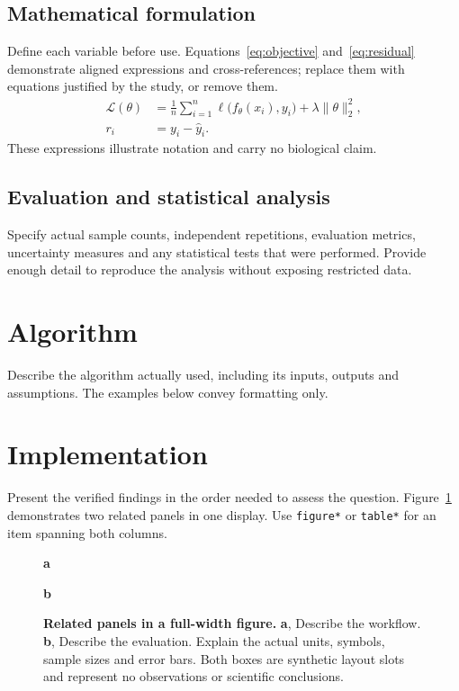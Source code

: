 \documentclass[unnumsec,webpdf,contemporary,large,namedate]{oup-authoring-template}
\begin{document}
\subsection{Mathematical formulation}
Define each variable before use. Equations~\eqref{eq:objective}
and~\eqref{eq:residual} demonstrate aligned expressions and cross-references;
replace them with equations justified by the study, or remove them.
\begin{align}
 \mathcal{L}(\theta)&=\frac{1}{n}\sum_{i=1}^{n}
  \ell\bigl(f_\theta(x_i),y_i\bigr)
  +\lambda\lVert\theta\rVert_2^2,\label{eq:objective}\\
 r_i&=y_i-\widehat y_i.\label{eq:residual}
\end{align}
These expressions illustrate notation and carry no biological claim.

\subsection{Evaluation and statistical analysis}
Specify actual sample counts, independent repetitions, evaluation metrics,
uncertainty measures and any statistical tests that were performed. Provide
enough detail to reproduce the analysis without exposing restricted data.

\section{Algorithm}\label{sec:algorithm}
Describe the algorithm actually used, including its inputs, outputs and
assumptions. The examples below convey formatting only.

\section{Implementation}\label{sec:implementation}
Present the verified findings in the order needed to assess the question.
Figure~\ref{fig:comparison} demonstrates two related panels in one display.
Use \texttt{figure*} or \texttt{table*} for an item spanning both columns.

\begin{figure}[t]
\centering
\begin{minipage}[t]{0.47\textwidth}
\raggedright\textbf{a}\par\smallskip
{}
\end{minipage}\hfill
\begin{minipage}[t]{0.47\textwidth}
\raggedright\textbf{b}\par\smallskip
{}
\end{minipage}
\caption{\textbf{Related panels in a full-width figure.} \textbf{a}, Describe
the workflow. \textbf{b}, Describe the evaluation. Explain the actual units,
symbols, sample sizes and error bars. Both boxes are synthetic layout slots
and represent no observations or scientific conclusions.}
\label{fig:comparison}
\end{figure}
\end{document}
